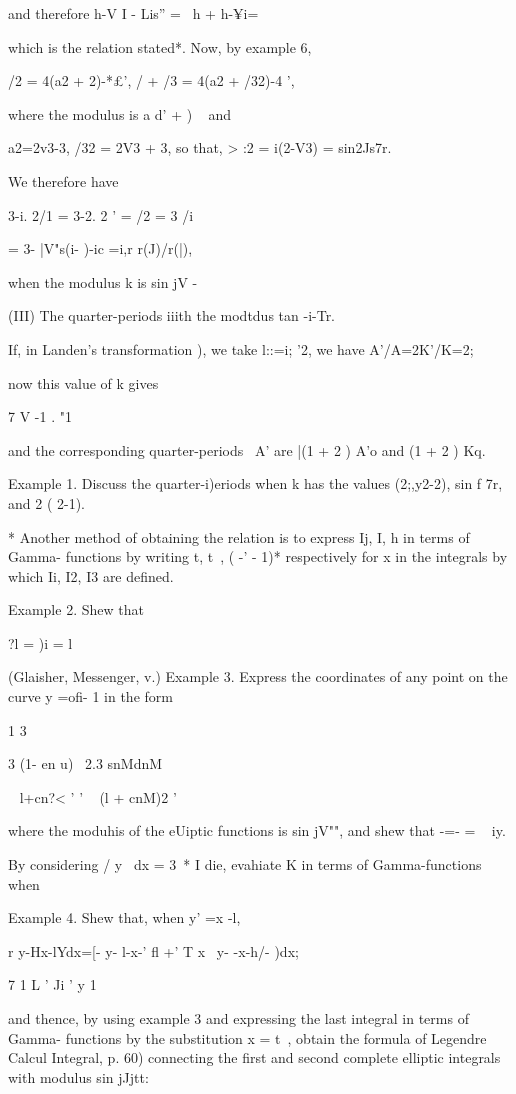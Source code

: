 and therefore h-V I - Lis'' = \ h + h-¥i=

which is the relation stated*. Now, by example 6,

/2 = 4(a2 + 2)-*£', / + /3 = 4(a2 + /32)-4 ',

where the modulus is a d' + ) ~ and

a2=2v3-3, /32 = 2V3 + 3, so that, > :2 = i(2-V3) = sin2Js7r.

We therefore have

3-i. 2/1 = 3-2. 2 ' = /2 = 3 /i

= 3- |V"s(i- )-ic =i,r r(J)/r(|),

when the modulus k is sin jV -

(III) The quarter-periods iiith the modtdus tan -i-Tr.

If, in Landen's transformation ), we take l::=i; '2, we have
A'/A=2K'/K=2;

now this value of k gives

7 V -1 . "1

and the corresponding quarter-periods \, A' are |(1 + 2 ) A'o and (1 +
2 ) Kq.

Example 1. Discuss the quarter-i)eriods when k has the values
(2;,y2-2), sin f 7r, and 2 ( 2-1).

* Another method of obtaining the relation is to express Ij, I, h in
terms of Gamma- functions by writing t, t~, ( -' - 1)* respectively
for x in the integrals by which Ii, I2, I3 are defined.

%
%

Example 2. Shew that

?l = )i = l

(Glaisher, Messenger, v.) Example 3. Express the coordinates of any
point on the curve y =ofi- 1 in the form

1 3

3 (1- en u) \ 2.3 snMdnM

 ~ l+cn?< ' ' ~ (l + cnM)2 '

where the moduhis of the eUiptic functions is sin jV"", and shew that
-=- = ~ iy.

By considering / y~ dx = 3~* I die, evahiate K in terms of
Gamma-functions when

Example 4. Shew that, when y' =x -l,

r y-Hx-lYdx=[- y- l-x-' fl +' T x~ y- -x-h/- )dx;

7 1 L ' Ji ' y 1

and thence, by using example 3 and expressing the last integral in
terms of Gamma- functions by the substitution x = t~, obtain the
formula of Legendre Calcul Integral, p. 60) connecting the first and
second complete elliptic integrals with modulus sin jJjtt:

